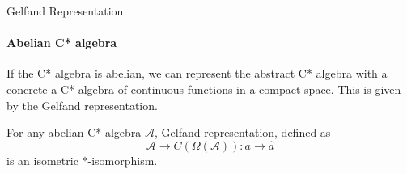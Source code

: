 \documentclass[handout, dvipsnames]{beamer}
\newcommand{\1}{\mathds{1}}	%
\begin{document}
\begin{frame}{Gelfand Representation}
\framesubtitle{Abelian C* algebra}
If the C* algebra is abelian, we can represent the abstract C* algebra with a concrete a C* algebra of continuous functions in a compact space. \pause This is given by the Gelfand representation.
\pause

\begin{theorem}[Gelfand]
  For any abelian C* algebra $\mathcal{A}$, Gelfand representation, defined as $$\mathcal{A} \to C(\Omega(\mathcal{A})): a \to \hat{a}$$
  is an isometric $*$-isomorphism.
\end{theorem}
\end{frame}

%
%
%
%
%
\end{document}
